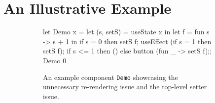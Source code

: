 \section{An Illustrative Example}\label{sec:example}
\begin{figure}[t]
  \centering
  \begin{subfigure}[b]{\linewidth}
    \centering
    \begin{minipage}{0.4\linewidth}
    \begin{reactcode}
let Demo x =
  let (s, setS) = useState x in
  let f = fun s -> s + 1 in
  if s = 0 then setS f;
  useEffect (if s = 1 then setS f);
  if s <= 1 then () else
    button (fun _ -> setS f);;
Demo 0
    \end{reactcode}
    \end{minipage}
    \caption{An example component \texttt{Demo} showcasing the unnecessary re-rendering issue and the top-level setter issue.}\label{fig:exdemo}
  \end{subfigure}\\
  \begin{subfigure}[b]{\linewidth}
    \centering
    \smaller[1]
    \setlength{\tabcolsep}{2.5pt}
    \renewcommand{\arraystretch}{1}
  

\end{subfigure}
\end{figure}
